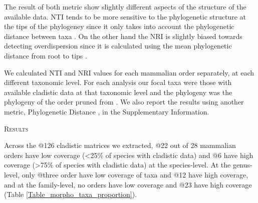 \documentclass[12pt,letterpaper]{article}
\renewcommand{\section}[1]{%
\bigskip
\begin{center}
\begin{Large}
\normalfont\scshape #1
\medskip
\end{Large}
\end{center}}
\begin{document}
The result of both metric show slightly different aspects of the structure of the available data.
NTI tends to be more sensitive to the phylogenetic structure at the tips of the phylogeney since it only takes into account the phylogenetic distance between taxa \citep{Cooper2008}.
On the other hand the NRI is slightly biased towards detecting overdispersion since it is calculated using the mean phylogenetic distance from root to tips \citep{Kembel2006,Swenson2006}.

We calculated NTI and NRI values for each mammalian order separately, at each different taxonomic level. 
For each analysis our focal taxa were those with available cladistic data at that taxonomic level and the phylogeny was the phylogeny of the order pruned from \citet{BinindaEmonds}.
We also report the results using another metric, Phylogenetic Distance \citep[PD;][]{Faith19921}, in the Supplementary Information. %

%
%

\section{Results}
Across the @126 cladistic matrices we extracted, @22 out of 28 mammalian orders have low coverage (\textless 25\% of species with cladistic data) and @6 have high coverage (\textgreater 75\% of species with cladistic data) at the species-level.
At the genus-level, only @three order have low coverage of taxa and @12 have high coverage, and at the family-level, no orders have low coverage and @23 have high coverage (Table \ref{Table_morpho_taxa_proportion}).
\end{document}
